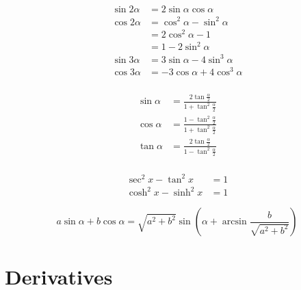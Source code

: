 \begin{multicols}{2}
\begin{equation*}
    \begin{aligned}    
        \sin 2\alpha &= 2 \sin\alpha \cos\alpha \\
        \cos 2\alpha &= \cos^2 \alpha - \sin^2 \alpha \\
        &= 2 \cos^2 \alpha - 1 \\
        &= 1 - 2 \sin^2 \alpha \\
        \sin 3\alpha &= 3 \sin\alpha - 4 \sin^3 \alpha \\
        \cos 3\alpha &= -3 \cos\alpha + 4 \cos^3 \alpha \\
    \end{aligned}
\end{equation*}

\begin{equation*}
    \begin{aligned}       
        \sin \alpha &= \frac{2 \tan \frac{\alpha}{2}}{1 + \tan^2 \frac{\alpha}{2}} \\
        \cos \alpha &= \frac{1 - \tan^2 \frac{\alpha}{2}}{1 + \tan^2 \frac{\alpha}{2}} \\
        \tan \alpha &= \frac{2 \tan \frac{\alpha}{2}}{1 - \tan^2 \frac{\alpha}{2}} \\  
    \end{aligned}
\end{equation*}

\begin{equation*}
    \begin{aligned}
        \sec^2 x - \tan^2 x &= 1 \\
        \cosh^2 x - \sinh^2 x &= 1
    \end{aligned}
\end{equation*}

\begin{equation*}
    a \sin\alpha + b \cos\alpha = \sqrt{a^2 + b^2}\sin\left(\alpha + \arcsin\frac{b}{\sqrt{a^2 + b^2}}\right)
\end{equation*}


\end{multicols}










\section{Derivatives}

